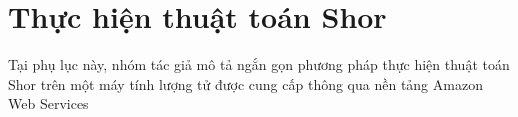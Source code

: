 \chapter{Thực hiện thuật toán Shor }
Tại phụ lục này, nhóm tác giả mô tả ngắn gọn phương pháp thực hiện thuật toán Shor trên một máy tính lượng tử được cung cấp thông qua nền tảng Amazon Web Services
